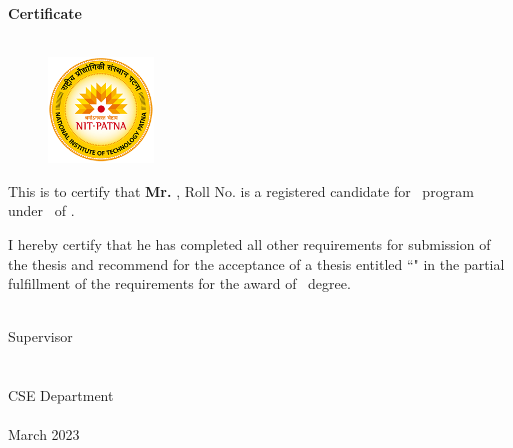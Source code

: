 \begin{center}
    \huge\textbf{Certificate}\\
    \MakeUppercase{\Large{\collegefullname}}\\
    \Large{\department}
\end{center}
\vspace{0.5cm}
\begin{figure}[H]
    \centering
    \includegraphics[width=0.25\textwidth]{figures/college_logo.png}
\end{figure}
\vspace{0.5cm}

This is to certify that \textbf{Mr. \cMembOne}, Roll No. \textbf{\cMembOneRoll} is a registered candidate for \courseShort\ program under \department\ of \collegefullname.

I hereby certify that he has completed all other requirements for submission of the thesis and recommend for the acceptance of a thesis entitled ``\textbf{\projectname}" in the partial fulfillment of the requirements for the award of \courseShort\ degree. 


\vspace{2cm}

\begin{minipage}[t]{0.45\textwidth}
    \begin{flushleft}
        {\underline{\hspace{5cm}}}\\
        Supervisor\\
        \guidename\\
        \guideDesignation \\
        CSE Department\\
        \collegefullname\\
        March 2023
    \end{flushleft}
\end{minipage}

